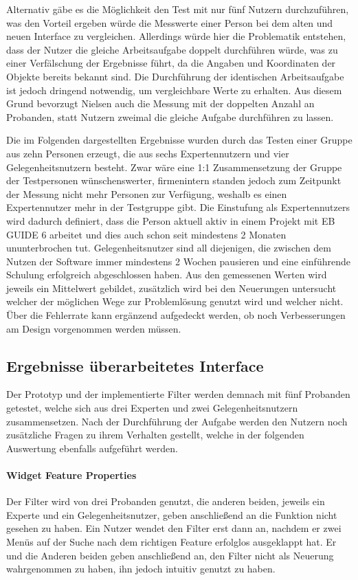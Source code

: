 Alternativ gäbe es die Möglichkeit den Test mit nur fünf Nutzern durchzuführen, was den Vorteil ergeben würde die Messwerte einer Person bei dem alten und neuen Interface zu vergleichen.
Allerdings würde hier die Problematik entstehen, dass der Nutzer die gleiche Arbeitsaufgabe doppelt durchführen würde, was zu einer Verfälschung der Ergebnisse führt, da die Angaben und Koordinaten der Objekte bereits bekannt sind.
Die Durchführung der identischen Arbeitsaufgabe ist jedoch dringend notwendig, um vergleichbare Werte zu erhalten.
Aus diesem Grund bevorzugt Nielsen auch die Messung mit der doppelten Anzahl an Probanden, statt Nutzern zweimal die gleiche Aufgabe durchführen zu lassen.\cite{.h}

Die im Folgenden dargestellten Ergebnisse wurden durch das Testen einer Gruppe aus zehn Personen erzeugt, die aus sechs Expertennutzern und vier Gelegenheitsnutzern besteht.
Zwar wäre eine 1:1 Zusammensetzung der Gruppe der Testpersonen wünschenswerter, firmenintern standen jedoch zum Zeitpunkt der Messung nicht mehr Personen zur Verfügung, weshalb es einen Expertennutzer mehr in der Testgruppe gibt.
Die Einstufung als Expertennutzers wird dadurch definiert, dass die Person aktuell aktiv in einem Projekt mit EB GUIDE 6 arbeitet und dies auch schon seit mindestens 2 Monaten ununterbrochen tut.
Gelegenheitsnutzer sind all diejenigen, die zwischen dem Nutzen der Software immer mindestens 2 Wochen pausieren und eine einführende Schulung erfolgreich abgeschlossen haben.
Aus den gemessenen Werten wird jeweils ein Mittelwert gebildet, zusätzlich wird bei den Neuerungen untersucht welcher der möglichen Wege zur Problemlösung genutzt wird und welcher nicht.
Über die Fehlerrate kann ergänzend aufgedeckt werden, ob noch Verbesserungen am Design vorgenommen werden müssen.

\subsection{Ergebnisse überarbeitetes Interface}
Der Prototyp und der implementierte Filter werden demnach mit fünf Probanden getestet, welche sich aus drei Experten und zwei Gelegenheitsnutzern zusammensetzen.
Nach der Durchführung der Aufgabe werden den Nutzern noch zusätzliche Fragen zu ihrem Verhalten gestellt, welche in der folgenden Auswertung ebenfalls aufgeführt werden.

\paragraph{Widget Feature Properties}
Der Filter wird von drei Probanden genutzt, die anderen beiden, jeweils ein Experte und ein Gelegenheitsnutzer, geben anschließend an die Funktion nicht gesehen zu haben.
Ein Nutzer wendet den Filter erst dann an, nachdem er zwei Menüs auf der Suche nach dem richtigen Feature erfolglos ausgeklappt hat.
Er und die Anderen beiden geben anschließend an, den Filter nicht als Neuerung wahrgenommen zu haben, ihn jedoch intuitiv genutzt zu haben.

